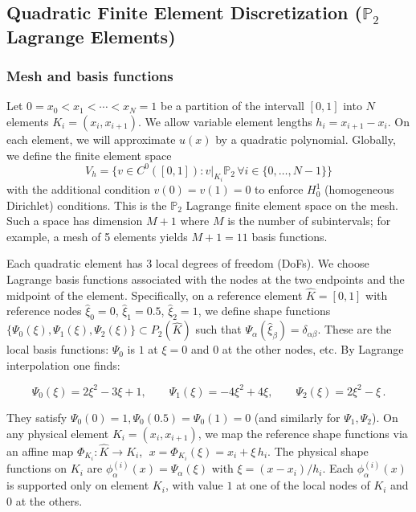 \clearpage


\subsection{Quadratic Finite Element Discretization (\(\mathbb{P}_2 \) Lagrange Elements)}
\subsubsection*{Mesh and basis functions}
Let \(0 = x_0 < x_1 < \cdots < x_N = 1\) be a partition of the intervall \([0,1]\) into \(N\) elements \(K_i = (x_i, x_{i+1})\).
We allow variable element lengths \(h_i = x_{i+1}-x_i\).
On each element, we will approximate \(u(x)\) by a quadratic polynomial. Globally, we define the finite element space
\[
	V_h = \{ v \in C^0([0,1]) : v|_{K_i} \mathbb{P}_2 \, \forall i \in \{0,\ldots,N-1\} \}
\]
with the additional condition \(v(0)=v(1)=0\) to enforce \(H^1_0\) (homogeneous Dirichlet) conditions.
This is the \(\mathbb{P}_2\) Lagrange finite element space on the mesh. Such a space has dimension \(M+1\) where \(M\) is the number of subintervals; for example, a mesh of 5 elements yields \(M+1=11\) basis functions.

Each quadratic element has 3 local degrees of freedom (DoFs).
We choose Lagrange basis functions associated with the nodes at the two endpoints and the midpoint of the element.
Specifically, on a reference element \(\hat K = [0,1]\) with reference nodes \(\hat\xi_0=0\), \(\hat\xi_1=0.5\), \(\hat\xi_2=1\), we define shape functions \(\{\Psi_0(\xi), \Psi_1(\xi), \Psi_2(\xi)\} \subset P_2(\hat K)\) such that \(\Psi_\alpha(\hat\xi_\beta) = \delta_{\alpha\beta}\).
These are the local basis functions: \(\Psi_0\) is \(1\) at \(\xi=0\) and \(0\) at the other nodes, etc. By Lagrange interpolation one finds:

\[
	\Psi_0(\xi) = 2\xi^2 - 3\xi + 1,\qquad
	\Psi_1(\xi) = -4\xi^2 + 4\xi,\qquad
	\Psi_2(\xi) = 2\xi^2 - \xi\,.
\]

They satisfy \(\Psi_0(0)=1,\Psi_0(0.5)=\Psi_0(1)=0\) (and similarly for \(\Psi_1,\Psi_2\)). On any physical element \(K_i=(x_i,x_{i+1})\), we map the reference shape functions via an affine map \(\Phi_{K_i}: \hat K \to K_i\), \(\;x = \Phi_{K_i}(\xi) = x_i + \xi\,h_i\).
The physical shape functions on \(K_i\) are \(\phi_{\alpha}^{(i)}(x) = \Psi_\alpha(\xi)\) with \(\xi = (x-x_i)/h_i\).
Each \(\phi_{\alpha}^{(i)}(x)\) is supported only on element \(K_i\), with value \(1\) at one of the local nodes of \(K_i\) and \(0\) at the others.

